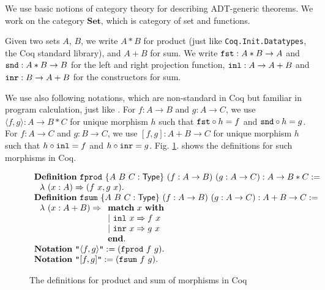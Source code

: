 \documentclass[runningheads, orivec]{llncs}
\begin{document}
We use basic notions of category theory for describing ADT-generic theorems. We work on the category \( \mathbf{Set} \), which is category of set and functions.

Given two sets \( A \), \( B \), we write \( A * B \) for product (just like \verb~Coq.Init.Datatypes~, the Coq standard library), and \( A + B \) for sum. We write \( \verb~fst~ : A * B \to A \) and \( \verb~snd~ : A * B \to B \) for the left and right projection function, \( \verb~inl~ : A \to A + B \) and \( \verb~inr~ : B \to A + B \) for the constructors for sum. 

We use also following notations, which are non-standard in Coq but familiar in program calculation, just like \cite{Uustalu:99}. For \( f : A \to B \) and \( g : A \to C \), we use \( \langle f, g \rangle : A \to B * C \) for unique morphism \( h \) such that \( \verb~fst~ \circ h = f \) and \( \verb~snd~ \circ h = g \). For \( f : A \to C \) and \( g : B \to C \), we use \( [f, g] : A + B \to C \) for unique morphism \( h \) such that \( h \circ \verb~inl~ = f \) and \( h \circ \verb~inr~ = g \). Fig. \ref{fig:def_product_sum_morphisms}. shows the definitions for such morphisms in Coq. 

\begin{figure}[t]
\[
\begin{array}{l}
\mathbf{Definition}~\verb~fprod~~\{A~B~C : \mathsf{Type}\}~(f : A \to B)~(g : A \to C) : A \to B * C := \\
~~\lambda~(x : A) \Rightarrow (f~x, g~x).\\
\mathbf{Definition}~\verb~fsum~~\{A~B~C : \mathsf{Type}\}~(f : A \to B)~(g : A \to C) : A + B \to C := \\
~~\lambda ~ (x : A + B) \Rightarrow \begin{array}[t]{l}
\mathbf{match}~x~\mathbf{with}\\
| ~ \verb~inl~~x \Rightarrow f~x \\
| ~ \verb~inr~~x \Rightarrow g~x \\
\mathbf{end}.
\end{array}\\
\mathbf{Notation}~\verb~"~ \langle f,g \rangle\verb~"~ := (\verb~fprod~~f~g).\\
\mathbf{Notation}~\verb~"~ [ f,g ]\verb~"~ := (\verb~fsum~~f~g).
\end{array}
\]

\caption{The definitions for product and sum of morphisms in Coq}
\label{fig:def_product_sum_morphisms}
\end{figure}
\end{document}
